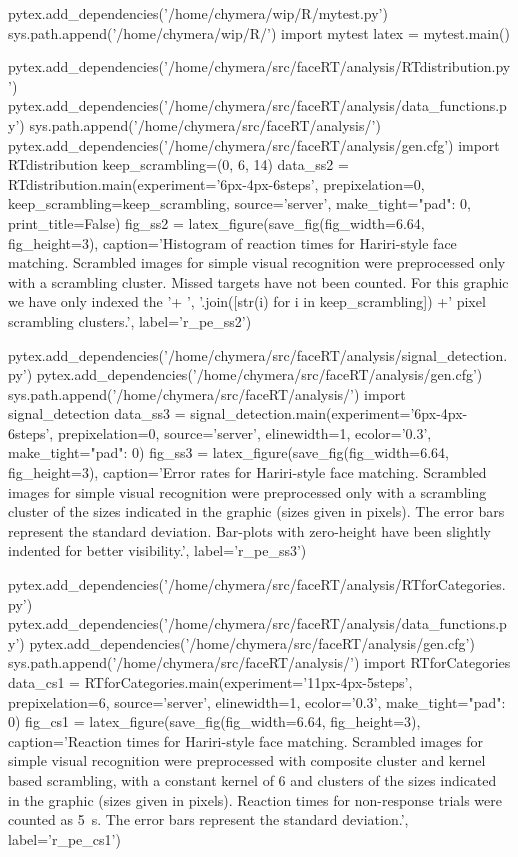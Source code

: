 \begin{pycode}
pytex.add_dependencies('/home/chymera/wip/R/mytest.py')
sys.path.append('/home/chymera/wip/R/')
import mytest
latex = mytest.main()
\end{pycode}
\begin{pycode}
pytex.add_dependencies('/home/chymera/src/faceRT/analysis/RTdistribution.py')
pytex.add_dependencies('/home/chymera/src/faceRT/analysis/data_functions.py')
sys.path.append('/home/chymera/src/faceRT/analysis/')
pytex.add_dependencies('/home/chymera/src/faceRT/analysis/gen.cfg')
import RTdistribution
keep_scrambling=(0, 6, 14)
data_ss2 = RTdistribution.main(experiment='6px-4px-6steps', prepixelation=0, keep_scrambling=keep_scrambling, source='server', make_tight={"pad": 0}, print_title=False)
fig_ss2 = latex_figure(save_fig(fig_width=6.64, fig_height=3), caption='Histogram of reaction times for Hariri-style face matching. Scrambled images for simple visual recognition were preprocessed only with a scrambling cluster. Missed targets have not been counted. For this graphic we have only indexed the '+ ', '.join([str(i) for i in keep_scrambling]) +' pixel scrambling clusters.', label='r_pe_ss2')
\end{pycode}
\begin{pycode}
pytex.add_dependencies('/home/chymera/src/faceRT/analysis/signal_detection.py')
pytex.add_dependencies('/home/chymera/src/faceRT/analysis/gen.cfg')
sys.path.append('/home/chymera/src/faceRT/analysis/')
import signal_detection
data_ss3 = signal_detection.main(experiment='6px-4px-6steps', prepixelation=0, source='server', elinewidth=1, ecolor='0.3', make_tight={"pad": 0})
fig_ss3 = latex_figure(save_fig(fig_width=6.64, fig_height=3), caption='Error rates for Hariri-style face matching. Scrambled images for simple visual recognition were preprocessed only with a scrambling cluster of the sizes indicated in the graphic (sizes given in pixels). The error bars represent the standard deviation. Bar-plots with zero-height have been slightly indented for better visibility.', label='r_pe_ss3')
\end{pycode}
\begin{pycode}
pytex.add_dependencies('/home/chymera/src/faceRT/analysis/RTforCategories.py')
pytex.add_dependencies('/home/chymera/src/faceRT/analysis/data_functions.py')
pytex.add_dependencies('/home/chymera/src/faceRT/analysis/gen.cfg')
sys.path.append('/home/chymera/src/faceRT/analysis/')
import RTforCategories
data_cs1 = RTforCategories.main(experiment='11px-4px-5steps', prepixelation=6, source='server', elinewidth=1, ecolor='0.3', make_tight={"pad": 0})
fig_cs1 = latex_figure(save_fig(fig_width=6.64, fig_height=3), caption='Reaction times for Hariri-style face matching. Scrambled images for simple visual recognition were preprocessed with composite cluster and kernel based scrambling, with a constant kernel of \SI{6}{\pixel} and clusters of the sizes indicated in the graphic (sizes given in pixels). Reaction times for non-response trials were counted as \SI{5}{\second}. The error bars represent the standard deviation.', label='r_pe_cs1')
\end{pycode}
